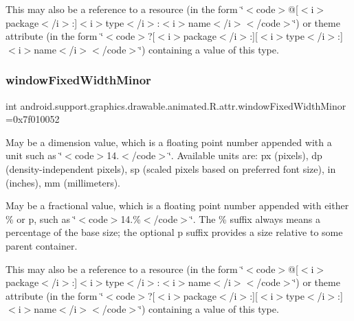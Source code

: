 This may also be a reference to a resource (in the form \char`\"{}$<$code$>$@\mbox{[}$<$i$>$package$<$/i$>$\+:\mbox{]}$<$i$>$type$<$/i$>$\+:$<$i$>$name$<$/i$>$$<$/code$>$\char`\"{}) or theme attribute (in the form \char`\"{}$<$code$>$?\mbox{[}$<$i$>$package$<$/i$>$\+:\mbox{]}\mbox{[}$<$i$>$type$<$/i$>$\+:\mbox{]}$<$i$>$name$<$/i$>$$<$/code$>$\char`\"{}) containing a value of this type. \mbox{\label{classandroid_1_1support_1_1graphics_1_1drawable_1_1animated_1_1R_1_1attr_ad5f5bd1f269448c1f507c538c532210c}} 
\subsubsection{\texorpdfstring{window\+Fixed\+Width\+Minor}{windowFixedWidthMinor}}
{\footnotesize\ttfamily int android.\+support.\+graphics.\+drawable.\+animated.\+R.\+attr.\+window\+Fixed\+Width\+Minor =0x7f010052\hspace{0.3cm}{\ttfamily [static]}}

May be a dimension value, which is a floating point number appended with a unit such as \char`\"{}$<$code$>$14.\+5sp$<$/code$>$\char`\"{}. Available units are\+: px (pixels), dp (density-\/independent pixels), sp (scaled pixels based on preferred font size), in (inches), mm (millimeters). 

May be a fractional value, which is a floating point number appended with either \% or p, such as \char`\"{}$<$code$>$14.\%$<$/code$>$\char`\"{}. The \% suffix always means a percentage of the base size; the optional p suffix provides a size relative to some parent container. 

This may also be a reference to a resource (in the form \char`\"{}$<$code$>$@\mbox{[}$<$i$>$package$<$/i$>$\+:\mbox{]}$<$i$>$type$<$/i$>$\+:$<$i$>$name$<$/i$>$$<$/code$>$\char`\"{}) or theme attribute (in the form \char`\"{}$<$code$>$?\mbox{[}$<$i$>$package$<$/i$>$\+:\mbox{]}\mbox{[}$<$i$>$type$<$/i$>$\+:\mbox{]}$<$i$>$name$<$/i$>$$<$/code$>$\char`\"{}) containing a value of this type. \mbox{\label{classandroid_1_1support_1_1graphics_1_1drawable_1_1animated_1_1R_1_1attr_a6690fed956f04f3595b8062079e49a33}} 
